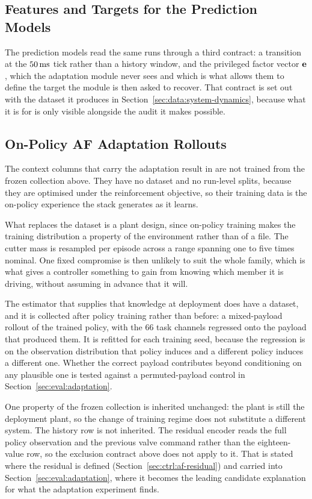 \subsection{Features and Targets for the Prediction Models}
\label{sec:data:sd-features}

The prediction models read the same runs through a third contract: a transition
at the $\unit[50]{ms}$ tick rather than a history window, and the privileged
factor vector $\mathbf{e}$, which the adaptation module never sees and which is
what allows them to define the target the module is then asked to recover. That
contract is set out with the dataset it produces in
Section~\ref{sec:data:system-dynamics}, because what it is for is only visible
alongside the audit it makes possible.

\subsection{On-Policy AF Adaptation Rollouts}
\label{sec:data:onpolicy}

The context columns that carry the adaptation result in \ppoAAMFD{} are not
trained from the frozen collection above. They have no dataset and no run-level
splits, because they are optimised under the reinforcement objective, so their
training data is the on-policy experience the stack generates as it learns.

What replaces the dataset is a plant design, since on-policy training makes the
training distribution a property of the environment rather than of a file. The
cutter mass is resampled per episode across a range spanning one to five times
nominal. One fixed compromise is then unlikely to suit the whole family, which
is what gives a controller something to gain from knowing which member it is
driving, without assuming in advance that it will.

The estimator that supplies that knowledge at deployment does have a dataset,
and it is collected after policy training rather than before: a mixed-payload
rollout of the trained policy, with the $66$ task channels regressed onto the
payload that produced them. It is refitted for each training seed, because the
regression is on the observation distribution that policy induces and a
different policy induces a different one. Whether the correct payload
contributes beyond conditioning on any plausible one is tested against a
permuted-payload control in Section~\ref{sec:eval:adaptation}.

One property of the frozen collection is inherited unchanged: the plant is still
the deployment plant, so the change of training regime does not substitute a
different system. The history row is not inherited. The residual encoder reads
the full policy observation and the previous valve command rather than the
eighteen-value row, so the exclusion contract above does not apply to it. That
is stated where the residual is defined
(Section~\ref{sec:ctrl:af-residual}) and carried into
Section~\ref{sec:eval:adaptation}, where it becomes the leading candidate
explanation for what the adaptation experiment finds.

